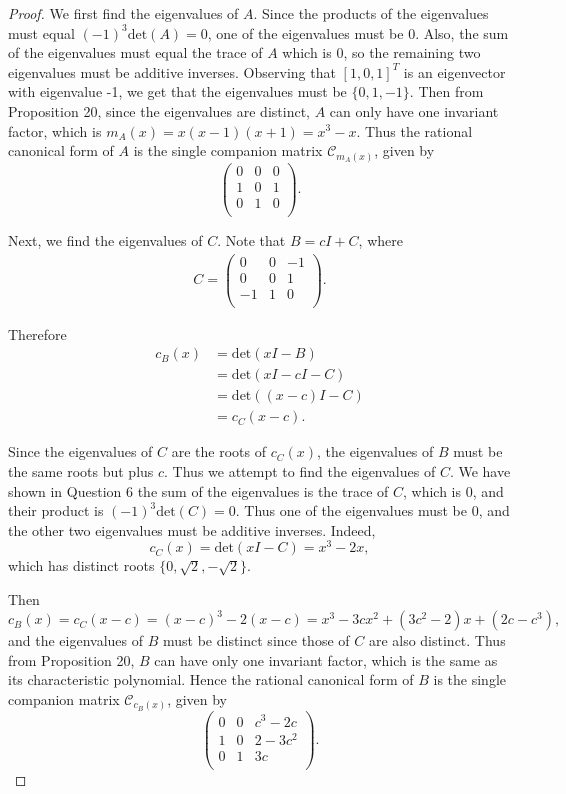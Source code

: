 \documentclass{article}
\begin{document}
  \begin{proof}
    We first find the eigenvalues of $A$. Since the products of the
    eigenvalues must equal $(-1)^3\text{det}(A)=0$, one of the eigenvalues
    must be 0. Also, the sum of the eigenvalues must equal the trace of $A$
    which is 0, so the remaining two eigenvalues must be additive inverses.
    Observing that $[1,0,1]^T$ is an eigenvector with eigenvalue -1, we get
    that the eigenvalues must be $\{0,1,-1\}$. Then from Proposition 20,
    since the eigenvalues are distinct, $A$ can only have one invariant
    factor, which is $m_A(x)=x(x-1)(x+1)=x^3-x$. Thus the rational
    canonical form of $A$ is the single companion matrix
    $\mathcal{C}_{m_A(x)}$, given by
    \[\begin{pmatrix}
      0&0&0\\
      1&0&1\\
      0&1&0\\
    \end{pmatrix}.\]

    Next, we find the eigenvalues of $C$. Note that $B=cI+C$, where
    \begin{align*}
      C=\begin{pmatrix}
        0&0&-1\\
        0&0&1\\
        -1&1&0\\
      \end{pmatrix}.
    \end{align*}

    Therefore
    \begin{align*}
      c_B(x) &=\text{det}(xI-B)\\
      &=\text{det}(xI-cI-C)\\
      &=\text{det}((x-c)I-C)\\
      &=c_C(x-c).
    \end{align*}

    Since the eigenvalues of $C$ are the roots of $c_C(x)$, the eigenvalues
    of $B$ must be the same roots but plus $c$. Thus we attempt to find the
    eigenvalues of $C$. We have shown in Question 6 the sum of the
    eigenvalues is the trace of $C$, which is 0, and their product is
    $(-1)^3\text{det}(C)=0$. Thus one of the eigenvalues must be 0, and the
    other two eigenvalues must be additive inverses. Indeed,
    \[c_C(x)=\text{det}(xI-C)=x^3-2x,\]
    which has distinct roots $\{0,\sqrt{2},-\sqrt{2}\}$.

    Then
    \[c_B(x)=c_C(x-c)=(x-c)^3-2(x-c) =x^3-3cx^2+(3c^2-2)x+(2c-c^3),\]
    and the eigenvalues of $B$ must be distinct since those of $C$ are also
    distinct. Thus from Proposition 20, $B$ can have only one invariant
    factor, which is the same as its characteristic polynomial. Hence the
    rational canonical form of $B$ is the single companion matrix
    $\mathcal{C}_{c_B(x)}$, given by
    \[\begin{pmatrix}
      0&0&c^3-2c\\
      1&0&2-3c^2\\
      0&1&3c\\
    \end{pmatrix}.\]
  \end{proof}
\end{document}
